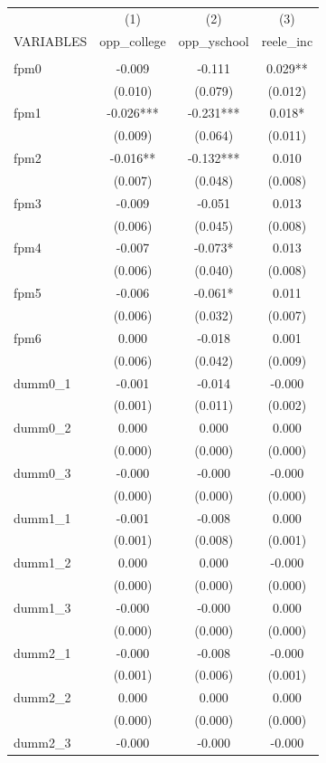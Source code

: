 \documentclass[]{article}
\begin{document}
\begin{tabular}{lccc} \hline
 & (1) & (2) & (3) \\
VARIABLES & opp\_college & opp\_yschool & reele\_inc \\ \hline
 &  &  &  \\
fpm0 & -0.009 & -0.111 & 0.029** \\
 & (0.010) & (0.079) & (0.012) \\
fpm1 & -0.026*** & -0.231*** & 0.018* \\
 & (0.009) & (0.064) & (0.011) \\
fpm2 & -0.016** & -0.132*** & 0.010 \\
 & (0.007) & (0.048) & (0.008) \\
fpm3 & -0.009 & -0.051 & 0.013 \\
 & (0.006) & (0.045) & (0.008) \\
fpm4 & -0.007 & -0.073* & 0.013 \\
 & (0.006) & (0.040) & (0.008) \\
fpm5 & -0.006 & -0.061* & 0.011 \\
 & (0.006) & (0.032) & (0.007) \\
fpm6 & 0.000 & -0.018 & 0.001 \\
 & (0.006) & (0.042) & (0.009) \\
dumm0\_1 & -0.001 & -0.014 & -0.000 \\
 & (0.001) & (0.011) & (0.002) \\
dumm0\_2 & 0.000 & 0.000 & 0.000 \\
 & (0.000) & (0.000) & (0.000) \\
dumm0\_3 & -0.000 & -0.000 & -0.000 \\
 & (0.000) & (0.000) & (0.000) \\
dumm1\_1 & -0.001 & -0.008 & 0.000 \\
 & (0.001) & (0.008) & (0.001) \\
dumm1\_2 & 0.000 & 0.000 & -0.000 \\
 & (0.000) & (0.000) & (0.000) \\
dumm1\_3 & -0.000 & -0.000 & 0.000 \\
 & (0.000) & (0.000) & (0.000) \\
dumm2\_1 & -0.000 & -0.008 & -0.000 \\
 & (0.001) & (0.006) & (0.001) \\
dumm2\_2 & 0.000 & 0.000 & 0.000 \\
 & (0.000) & (0.000) & (0.000) \\
dumm2\_3 & -0.000 & -0.000 & -0.000 \\

\end{tabular}
\end{document}
